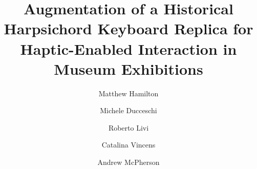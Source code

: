 \documentclass[sigconf]{nimeart}
\begin{document}
\title{Augmentation of a Historical Harpsichord Keyboard Replica for Haptic-Enabled Interaction in Museum Exhibitions}

\author{Matthew Hamilton}
\author{Michele Ducceschi}

\author{Roberto Livi}
  
\author{Catalina Vincens}

\author{Andrew McPherson}

\end{document}
